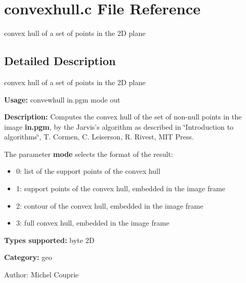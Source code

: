 \section{convexhull.c File Reference}
\label{convexhull_8c}
convex hull of a set of points in the 2D plane  




\label{_details}
\subsection{Detailed Description}
convex hull of a set of points in the 2D plane 

{\bf Usage:} convewhull in.pgm mode out

{\bf Description:} Computes the convex hull of the set of non-null points in the image {\bf in.pgm}, by the Jarvis's algorithm as described in \char`\"{}Introduction to algorithms\char`\"{}, T. Cormen, C. Leiserson, R. Rivest, MIT Press.

The parameter {\bf mode} selects the format of the result: \begin{itemize}
\item 0: list of the support points of the convex hull \item 1: support points of the convex hull, embedded in the image frame \item 2: contour of the convex hull, embedded in the image frame \item 3: full convex hull, embedded in the image frame\end{itemize}
{\bf Types supported:} byte 2D

{\bf Category:} geo

\begin{Desc}
\item[Author:]Michel Couprie \end{Desc}

